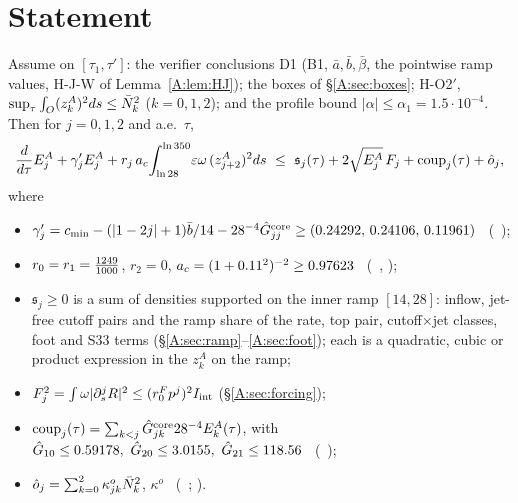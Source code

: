 \documentclass[11pt]{article}
\begin{document}
\section{Statement}\label{A:sec:statement}
\begin{proposition}\label{A:prop:level}
Assume on $[\tau_1,\tau']$: the verifier conclusions D1 (B1, $\bar a,\bar b,\bar\beta$, the pointwise ramp values, H-J-W of Lemma~\ref{A:lem:HJ}); the boxes of \S\ref{A:sec:boxes}; H-O2$'$, $\sup_\tau\int_O(z^A_k)^2ds\le\bar N_k^2$ ($k=0,1,2$); and the profile bound $|\alpha|\le\alpha_1=1.5\cdot10^{-4}$. Then for $j=0,1,2$ and a.e.\ $\tau$,
\begin{equation}\label{A:eq:D1}
\frac{d}{d\tau}E^A_j+\gamma'_jE^A_j+r_j\,a_c\!\int_{\ln28}^{\ln350}\!\varepsilon\omega\,(z^A_{j+2})^2ds\ \le\ \mathfrak s_j(\tau)+2\sqrt{E^A_j}\,F_j+\mathrm{coup}_j(\tau)+\oh_j ,
\end{equation}
where
\begin{itemize}[leftmargin=*]
\item $\gamma'_j=c_{\min}-(|1-2j|+1)\bar b/14-28^{-4}\hat G^{\rm core}_{jj}\ge(0.24292,\,0.24106,\,0.11961)$ \tC\ (\SA\ );
\item $r_0=r_1=\tfrac{1249}{1000}$, $r_2=0$, $a_c=(1+0.11^2)^{-2}\ge0.97623$ \tC\ (\SA\ , );
\item $\mathfrak s_j\ge0$ is a sum of densities supported on the inner ramp $[14,28]$: inflow, jet-free cutoff pairs and the ramp share of the rate, top pair, cutoff$\times$jet classes, foot and S33 terms (\S\ref{A:sec:ramp}--\ref{A:sec:foot}); each is a quadratic, cubic or product expression in the $z^A_k$ on the ramp;
\item $F_j^2=\int\omega|\partial_s^jR|^2\le(r_0^Fp^j)^2I_{\rm int}$ (\S\ref{A:sec:forcing});
\item $\mathrm{coup}_j(\tau)=\sum_{k<j}\hat G^{\rm core}_{jk}28^{-4}E^A_k(\tau)$, with $\hat G_{10}\le0.59178,\ \hat G_{20}\le3.0155,\ \hat G_{21}\le118.56$ \tC\ (\SA\ );
\item $\hat o_j=\sum_{k=0}^2\kappa^o_{jk}\bar N_k^2$, $\kappa^o$ \tC\ (\SA\ ; ).
\end{itemize}
\end{proposition}
\end{document}
